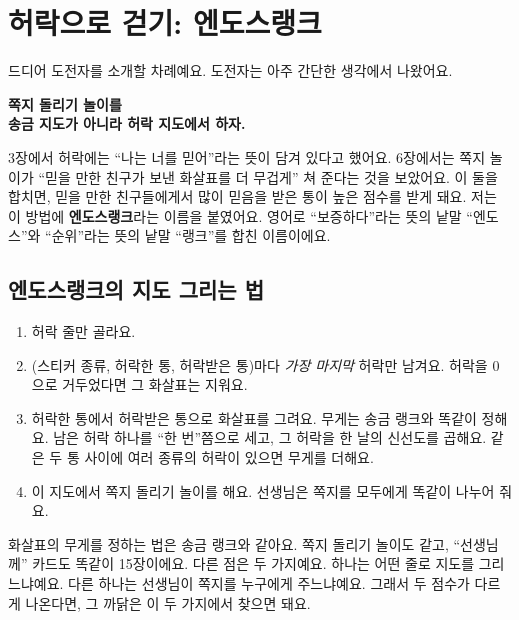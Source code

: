 \chapter{허락으로 걷기: 엔도스랭크}

드디어 도전자를 소개할 차례예요.
도전자는 아주 간단한 생각에서 나왔어요.

\begin{center}
\begin{tcolorbox}[colback=white, colframe=allowcol, boxrule=0.8pt, arc=2mm, width=0.9\linewidth, halign=center]
\titlefont\bfseries 쪽지 돌리기 놀이를\\송금 지도가 아니라 허락 지도에서 하자.
\end{tcolorbox}
\end{center}

3장에서 허락에는 “나는 너를 믿어”라는 뜻이 담겨 있다고 했어요.
6장에서는 쪽지 놀이가 “믿을 만한 친구가 보낸 화살표를 더 무겁게” 쳐 준다는 것을 보았어요.
이 둘을 합치면, 믿을 만한 친구들에게서 많이 믿음을 받은 통이 높은 점수를 받게 돼요.
저는 이 방법에 \textbf{엔도스랭크}라는 이름을 붙였어요.
영어로 “보증하다”라는 뜻의 낱말 “엔도스”와 “순위”라는 뜻의 낱말 “랭크”를 합친 이름이에요.

\section{엔도스랭크의 지도 그리는 법}

\begin{enumerate}
\item 허락 줄만 골라요.
\item (스티커 종류, 허락한 통, 허락받은 통)마다 \emph{가장 마지막} 허락만 남겨요.
      허락을 0으로 거두었다면 그 화살표는 지워요.
\item 허락한 통에서 허락받은 통으로 화살표를 그려요.
      무게는 송금 랭크와 똑같이 정해요. 남은 허락 하나를 “한 번”쯤으로 세고, 그 허락을 한 날의 신선도를 곱해요.
      같은 두 통 사이에 여러 종류의 허락이 있으면 무게를 더해요.
\item 이 지도에서 쪽지 돌리기 놀이를 해요. 선생님은 쪽지를 모두에게 똑같이 나누어 줘요.
\end{enumerate}

화살표의 무게를 정하는 법은 송금 랭크와 같아요.
쪽지 돌리기 놀이도 같고, “선생님께” 카드도 똑같이 15장이에요.
다른 점은 두 가지예요.
하나는 어떤 줄로 지도를 그리느냐예요.
다른 하나는 선생님이 쪽지를 누구에게 주느냐예요.
그래서 두 점수가 다르게 나온다면, 그 까닭은 이 두 가지에서 찾으면 돼요.

